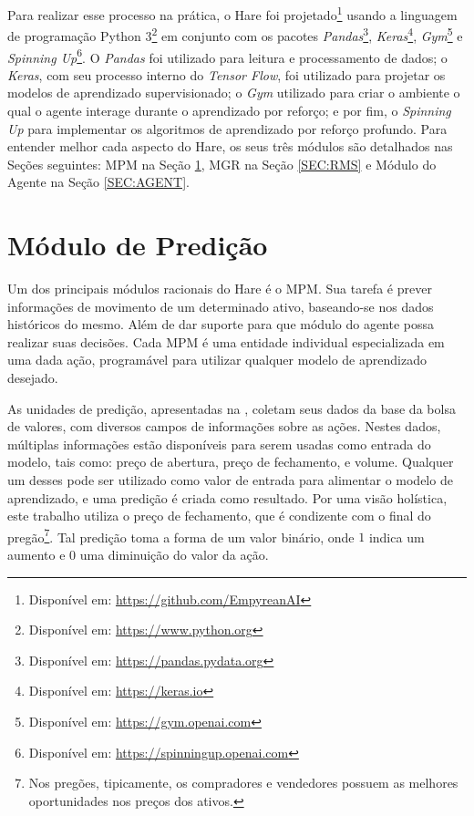 Para realizar esse processo na prática, o Hare foi projetado\footnote{Disponível em: \url{https://github.com/EmpyreanAI}} usando a linguagem de programação Python 3\footnote{Disponível em: \url{https://www.python.org}} em conjunto com os pacotes \textit{Pandas}\footnote{Disponível em: \url{https://pandas.pydata.org}}, \textit{Keras}\footnote{Disponível em: \url{https://keras.io}}, \textit{Gym}\footnote{Disponível em: \url{https://gym.openai.com}} e \textit{Spinning Up}\footnote{Disponível em: \url{https://spinningup.openai.com}}.
O \textit{Pandas} foi utilizado para leitura e processamento de dados; o  \textit{Keras}, com seu processo interno do \textit{Tensor Flow}, foi utilizado para projetar os modelos de aprendizado supervisionado; o \textit{Gym} utilizado para criar o ambiente o qual o agente interage durante o aprendizado por reforço; e por fim, o \textit{Spinning Up} para implementar os algoritmos de aprendizado por reforço profundo. Para entender melhor cada aspecto do Hare, os seus três módulos são detalhados nas Seções seguintes: \acrlong{MPM} na Seção \ref{SEC:INSIDERS}, \acrshort{MGR} na Seção \ref{SEC:RMS} e Módulo do Agente na Seção \ref{SEC:AGENT}.

\section{Módulo de Predição}
\label{SEC:INSIDERS}

Um dos principais módulos racionais do Hare é o \acrfull{MPM}. Sua tarefa é prever informações de movimento de um determinado ativo, baseando-se nos dados históricos do mesmo. Além de dar suporte para que módulo do agente possa realizar suas decisões. Cada \acrshort{MPM} é uma entidade individual especializada em uma dada ação, programável para utilizar qualquer modelo de aprendizado desejado. 

As unidades de predição, apresentadas na , coletam seus dados da base da bolsa de valores, com diversos campos de informações sobre as ações. Nestes dados, múltiplas informações estão disponíveis para serem usadas como entrada do modelo, tais como: preço de abertura, preço de fechamento, e volume. Qualquer um desses pode ser utilizado como valor de entrada para alimentar o modelo de aprendizado, e uma predição é criada como resultado. Por uma visão holística, este trabalho utiliza o preço de fechamento, que é condizente com o final do pregão\footnote{Nos pregões, tipicamente, os compradores e vendedores possuem as melhores oportunidades nos preços dos ativos.}. Tal predição toma a forma de um valor binário, onde $1$ indica um aumento e $0$ uma diminuição do valor da ação.

